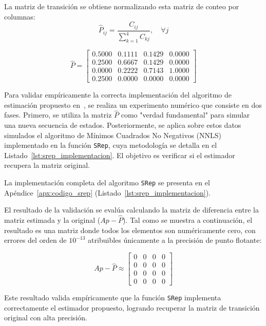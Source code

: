 \begin{examplex}
La matriz de transición se obtiene normalizando esta matriz de conteo por columnas:
\begin{equation}
    \hat{P}_{ij} = \frac{C_{ij}}{\sum_{k=1}^4 C_{kj}}, \quad \forall j
\end{equation}

\[
\hat{P}=
\begin{bmatrix}
0.5000 & 0.1111 & 0.1429 & 0.0000 \\
0.2500 & 0.6667 & 0.1429 & 0.0000 \\
0.0000 & 0.2222 & 0.7143 & 1.0000 \\
0.2500 & 0.0000 & 0.0000 & 0.0000
\end{bmatrix}
\]

Para validar empíricamente la correcta implementación del algoritmo de estimación propuesto en~\cite{vides_lopez_srep_2025}, se realiza un experimento numérico que consiste en dos fases. Primero, se utiliza la matriz  \(\hat{P}\) como "verdad fundamental" para simular una nueva secuencia de estados. Posteriormente, se aplica sobre estos datos simulados el algoritmo de Mínimos Cuadrados No Negativos (NNLS) implementado en la función \texttt{SRep}, cuya metodología se detalla en el Listado~\ref{lst:srep_implementacion}. El objetivo es verificar si el estimador recupera la matriz original.

La implementación completa del algoritmo \texttt{SRep} se
presenta en el Apéndice~\ref{apx:codigo_srep}
(Listado~\ref{lst:srep_implementacion}).

El resultado de la validación se evalúa calculando la matriz de diferencia entre la matriz estimada y la original (\(Ap -\hat{P}\)). Tal como se muestra a continuación, el resultado es una matriz donde todos los elementos son numéricamente cero, con errores del orden de \(10^{-13}\) atribuibles únicamente a la precisión de punto flotante:

\[
Ap -\hat{P} \approx
\begin{bmatrix}
 0 & 0 & 0 & 0 \\
 0 & 0 & 0 & 0 \\
 0 & 0 & 0 & 0 \\
 0 & 0 & 0 & 0
\end{bmatrix}
\]

Este resultado valida empíricamente que la función \texttt{SRep} implementa correctamente el estimador propuesto, logrando recuperar la matriz de transición original con alta precisión.

\begin{figure}[H]
\centering
\begin{tikzpicture}[
    node distance=3cm,
    every node/.style={fill=white, inner sep=2pt},
    state/.style={circle, draw, thick, minimum size=1.8cm, font=\small},
    arrow/.style={->, >=stealth, thick},
    prob/.style={font=\scriptsize, midway, fill=white, inner sep=1pt}
]


\end{tikzpicture}
\end{figure}
\end{examplex}
